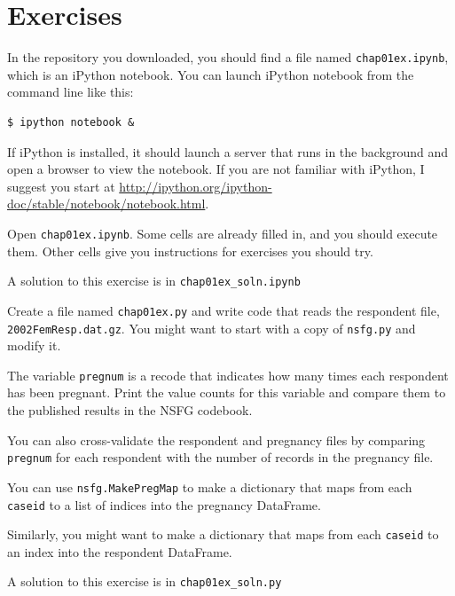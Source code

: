 \documentclass[12pt]{book}
\begin{document}
\section{Exercises}

\begin{exercise}
In the repository you downloaded, you should find a file named
\verb"chap01ex.ipynb", which is an iPython notebook.  You can
launch iPython notebook from the command line like this:

\begin{verbatim}
$ ipython notebook &
\end{verbatim}

If iPython is installed, it should launch a server that runs in the
background and open a browser to view the notebook.  If you are not
familiar with iPython, I suggest you start at
\url{http://ipython.org/ipython-doc/stable/notebook/notebook.html}.

Open \verb"chap01ex.ipynb".  Some cells are already filled in, and
you should execute them.  Other cells give you instructions for
exercises you should try.

A solution to this exercise is in \verb"chap01ex_soln.ipynb"
\end{exercise}


\begin{exercise}
Create a file named \verb"chap01ex.py" and write code that reads
the respondent file, {\tt 2002FemResp.dat.gz}.  You might want to
start with a copy of {\tt nsfg.py} and modify it.

The variable {\tt pregnum} is a recode that indicates how many
times each respondent has been pregnant.  Print the value counts
for this variable and compare them to the published results in
the NSFG codebook.

You can also cross-validate the respondent and pregnancy files by
comparing {\tt pregnum} for each respondent with the number of
records in the pregnancy file.

You can use {\tt nsfg.MakePregMap} to make a dictionary that maps
from each {\tt caseid} to a list of indices into the pregnancy
DataFrame.

Similarly, you might want to make a dictionary that maps from each
{\tt caseid} to an index into the respondent DataFrame.

A solution to this exercise is in \verb"chap01ex_soln.py"
\end{exercise}
\end{document}
